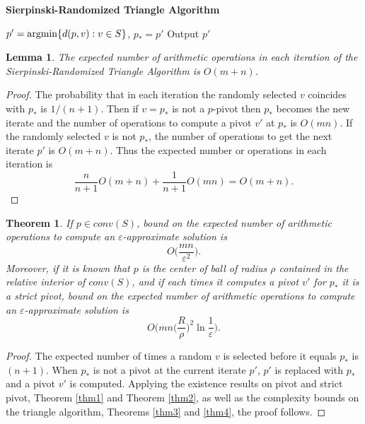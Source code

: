 \documentclass{article}
\newtheorem{thm}{Theorem}
\newtheorem{lemma}{Lemma}
\theoremstyle{definition}
\begin{document}
\begin{algorithm}[htpb]
{\bf Sierpinski-Randomized Triangle Algorithm}\

$p'={\rm argmin}\{d(p,v): v \in S\}$, $p_*=p'$\;
 Output $p'$\;
\end{algorithm}


\begin{lemma} The expected number of arithmetic operations in each iteration of the Sierpinski-Randomized Triangle Algorithm is $O(m+n)$.
\end{lemma}

\begin{proof} The probability that in each iteration the randomly selected $v$ coincides with $p_*$ is $1/(n+1)$. Then if $v=p_*$ is not a $p$-pivot then $p_*$ becomes the new iterate and the number of operations to compute a pivot $v'$ at $p_*$ is $O(mn)$. If the randomly selected $v$ is not $p_*$, the number of operations to get the next iterate $p'$ is $O(m+n)$.  Thus the expected number or operations in each iteration is
$$\frac{n}{n+1} O(m+n)+ \frac{1}{n+1} O(mn) = O(m+n).$$
\end{proof}

\begin{thm} If $p \in conv(S)$, bound on the expected number of arithmetic operations to compute an $\varepsilon$-approximate solution is
$$O \bigg (\frac{mn}{\varepsilon^2} \bigg ).$$
Moreover, if it is known that $p$ is the center of ball of radius $\rho$ contained in the relative interior of $conv(S)$, and if each times it computes a pivot $v'$ for $p_*$ it is a strict pivot, bound on the expected number of arithmetic operations to compute an $\varepsilon$-approximate solution is
$$O\bigg (mn \bigg (\frac{R}{\rho} \bigg)^2 \ln \frac{1}{\varepsilon} \bigg).$$
\end{thm}
\begin{proof} The expected number of times a random $v$ is selected before it equals $p_*$ is $(n+1)$. When $p_*$ is not a pivot at the current iterate $p'$,  $p'$ is replaced with $p_*$ and a pivot $v'$ is computed.  Applying the existence results on  pivot and strict pivot, Theorem \ref{thm1} and Theorem \ref{thm2}, as well as the complexity bounds on the triangle algorithm, Theorems \ref{thm3} and \ref{thm4}, the proof follows.
\end{proof}
\end{document}
